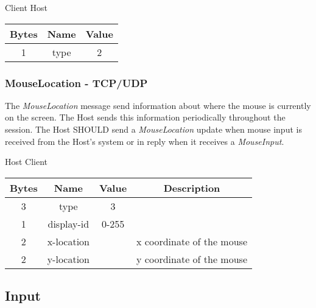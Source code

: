 \documentclass{article}
\begin{document}
    \begin{center}
        Client \textrightarrow Host\\
        \begin{tabular}{|c|c|c|}
            \hline
            \textbf{Bytes} & \textbf{Name} & \textbf{Value} \\
            \hline
            1              & type          & 2              \\
            \hline
        \end{tabular}
    \end{center}

    \subsubsection{MouseLocation - TCP/UDP}

    The \emph{MouseLocation} message send information about where the mouse is currently on the screen.
    The Host sends this information periodically throughout the session.
    The Host SHOULD send a \emph{MouseLocation} update when mouse input is received from the Host's system or in reply when it receives a \emph{MouseInput}.

    \begin{center}
        Host \textrightarrow Client\\
        \begin{tabular}{|c|c|c|c|}
            \hline
            \textbf{Bytes} & \textbf{Name} & \textbf{Value} & \textbf{Description}      \\
            \hline
            3              & type          & 3              &                           \\
            \hline
            1              & display-id    & 0-255          &                           \\
            \hline
            2              & x-location    &                & x coordinate of the mouse \\
            \hline
            2              & y-location    &                & y coordinate of the mouse \\
            \hline
        \end{tabular}
    \end{center}

    \subsection{Input}
\end{document}
